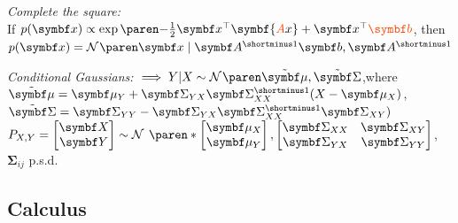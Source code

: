 \emph{Complete the square:}\\
If $p(\symbf x) \propto \exp(-\frac12 \symbf x^\top \symbf{\orange{A}x} + \symbf x^\top \orange{\symbf b})$,
then $p(\symbf x) = \Gauss{\symbf x \mid \symbf A^{\shortminus1} \symbf b, \symbf A^{\shortminus1}}$

\emph{Conditional Gaussians:}\enskip
$\implies Y\vert X \sim \Gauss{\tilde{\symbf\mu}, \tilde{\symbf\Sigma}}$,\enskip where\\
$\tilde{\symbf\mu} = \symbf\mu_Y + \symbf\Sigma_{YX} \symbf\Sigma_{XX}^{\shortminus1} (X - \symbf\mu_X)$,\enskip
$\tilde{\symbf\Sigma} = \symbf\Sigma_{YY} - \symbf\Sigma_{YX} \symbf\Sigma_{XX}^{\shortminus1} \symbf\Sigma_{XY})$\\
$P_{X,Y} = \begin{bmatrix} \symbf X \\ \symbf Y \end{bmatrix} \sim
\Gauss*[~]{
    \begin{bmatrix} \symbf\mu_X \\ \symbf\mu_Y \end{bmatrix} ,
    \begin{bmatrix} \symbf\Sigma_{XX} & \symbf\Sigma_{XY} \\ \symbf\Sigma_{YX} & \symbf\Sigma_{YY} \end{bmatrix}
}$,\enspace $\symbf\Sigma_{ij}$ p.s.d.


\subsection*{Calculus}

